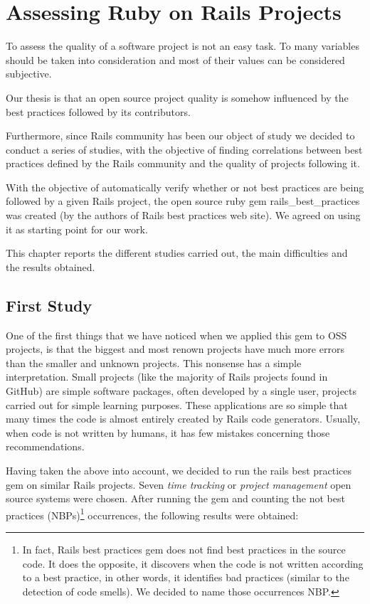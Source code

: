 \thispagestyle{empty}
\chapter{Assessing Ruby on Rails Projects}\label{chap:assissing_ror}

To assess the quality of a software project is not an easy task.
To many variables should be taken into consideration and most of their values can be considered subjective.

Our thesis is that an open source project quality is somehow influenced by the best practices followed 
by its contributors.

Furthermore, since Rails community has been our object of study we decided to conduct a series of studies, 
with the objective of finding correlations between best practices defined by the Rails community and
the quality of projects following it.

With the objective of automatically verify whether or not best practices are being followed by
a given Rails project, the open source ruby gem rails\_best\_practices 
was created (by the authors of Rails best practices web site).
We agreed on using it as starting point for our work.

This chapter reports the different studies carried out, the main difficulties and the results obtained.



\section{First Study}\label{subsec:first_study}
One of the first things that we have noticed when we applied this gem to OSS projects,
is that the biggest and most renown projects have much more errors than the smaller and unknown projects.
This nonsense has a simple  interpretation.
Small projects (like the majority of Rails projects found in GitHub) are simple software packages,
often developed by a single user, projects carried out for simple learning purposes.
These applications are so simple that many times the code is almost entirely created by Rails code generators.
Usually, when code is not written by humans, it has few mistakes concerning those recommendations.

Having taken the above into account, we decided to run the rails best practices gem on similar Rails projects.
Seven \emph{time tracking} or \emph{project management} open source systems were chosen.
After running the gem and counting the
\textsf{not best practices (NBPs)}\footnote{In fact, Rails best practices gem does not find best practices in the source code.
  It does the opposite, it discovers when the code is not written according to a best practice, in other words, 
  it identifies bad practices (similar to the detection of code smells).
  We decided to name those occurrences NBP.
}
occurrences, the following results were obtained:

